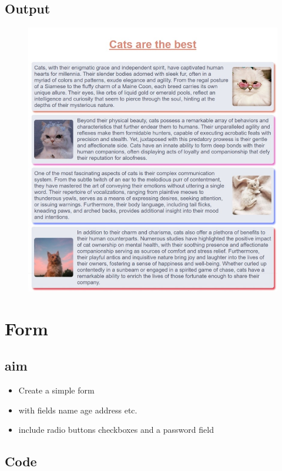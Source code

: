 \documentclass{article}
\begin{document}
\subsection{Output}
\begin{figure}[h!]
	\centering
	\includegraphics[width=1.0\textwidth]{./assets/p03.jpeg}
\end{figure}
\newpage

\section{Form}
\subsection{aim}
\begin{itemize}
	\item Create a simple form
	\item with fields name age address etc.
	\item include radio buttons checkboxes and a password field
\end{itemize}

\subsection{Code}
\inputminted[frame=lines, breaklines, breakanywhere, numberblanklines=false]{html}{./prog_4/index.html}
\end{document}
